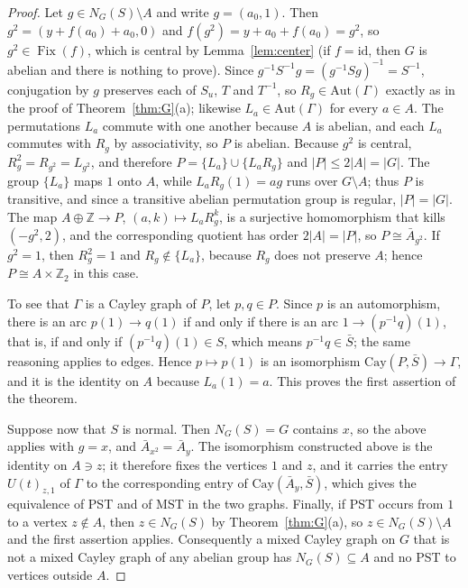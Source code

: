 \documentclass[preprint,11pt]{elsarticle}
\theoremstyle{definition}
\theoremstyle{remark}
\DeclareMathOperator{\Fix}{Fix}
\newcommand{\Z}{\mathbb Z}
\begin{document}
\begin{proof}
Let $g\in N_G(S)\setminus A$ and write $g=(a_0,1)$. Then $g^2=(y+f(a_0)+a_0,0)$ and $f(g^2)=y+a_0+f(a_0)=g^2$, so $g^2\in\Fix(f)$, which is central by Lemma~\ref{lem:center} (if $f=\mathrm{id}$, then $G$ is abelian and there is nothing to prove). Since $g^{-1}S^{-1}g=(g^{-1}Sg)^{-1}=S^{-1}$, conjugation by $g$ preserves each of $S_u$, $T$ and $T^{-1}$, so $R_g\in\mathrm{Aut}(\Gamma)$ exactly as in the proof of Theorem~\ref{thm:G}(a); likewise $L_a\in\mathrm{Aut}(\Gamma)$ for every $a\in A$. The permutations $L_a$ commute with one another because $A$ is abelian, and each $L_a$ commutes with $R_g$ by associativity, so $P$ is abelian. Because $g^2$ is central, $R_g^2=R_{g^2}=L_{g^2}$, and therefore $P=\{L_a\}\cup\{L_aR_g\}$ and $|P|\le2|A|=|G|$. The group $\{L_a\}$ maps $1$ onto $A$, while $L_aR_g(1)=ag$ runs over $G\setminus A$; thus $P$ is transitive, and since a transitive abelian permutation group is regular, $|P|=|G|$. The map $A\oplus\Z\to P$, $(a,k)\mapsto L_aR_g^k$, is a surjective homomorphism that kills $(-g^2,2)$, and the corresponding quotient has order $2|A|=|P|$, so $P\cong\bar A_{g^2}$. If $g^2=1$, then $R_g^2=1$ and $R_g\notin\{L_a\}$, because $R_g$ does not preserve $A$; hence $P\cong A\times\Z_2$ in this case.

To see that $\Gamma$ is a Cayley graph of $P$, let $p,q\in P$. Since $p$ is an automorphism, there is an arc $p(1)\to q(1)$ if and only if there is an arc $1\to(p^{-1}q)(1)$, that is, if and only if $(p^{-1}q)(1)\in S$, which means $p^{-1}q\in\bar S$; the same reasoning applies to edges. Hence $p\mapsto p(1)$ is an isomorphism $\mathrm{Cay}(P,\bar S)\to\Gamma$, and it is the identity on $A$ because $L_a(1)=a$. This proves the first assertion of the theorem.

Suppose now that $S$ is normal. Then $N_G(S)=G$ contains $x$, so the above applies with $g=x$, and $\bar A_{x^2}=\bar A_y$. The isomorphism constructed above is the identity on $A\ni z$; it therefore fixes the vertices $1$ and $z$, and it carries the entry $U(t)_{z,1}$ of $\Gamma$ to the corresponding entry of $\mathrm{Cay}(\bar A_y,\bar S)$, which gives the equivalence of PST and of MST in the two graphs. Finally, if PST occurs from $1$ to a vertex $z\notin A$, then $z\in N_G(S)$ by Theorem~\ref{thm:G}(a), so $z\in N_G(S)\setminus A$ and the first assertion applies. Consequently a mixed Cayley graph on $G$ that is not a mixed Cayley graph of any abelian group has $N_G(S)\subseteq A$ and no PST to vertices outside $A$.\qedhere
\end{proof}
\end{document}
